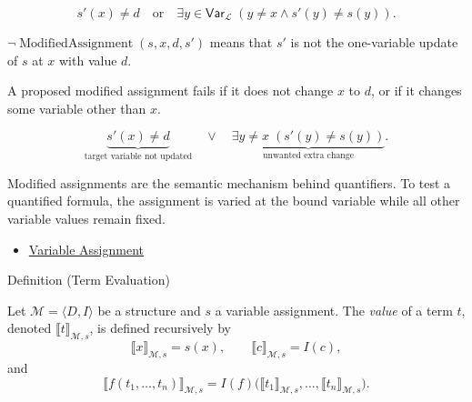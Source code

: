 \begin{remark*}
\[
s'(x)\neq d
\quad\text{or}\quad
\exists y\in\mathsf{Var}_{\mathcal L}\;(y\neq x\land s'(y)\neq s(y)).
\]
\end{remark*}

\begin{remark*}
\(\neg\operatorname{ModifiedAssignment}(s,x,d,s')\) means that \(s'\) is not the
one-variable update of \(s\) at \(x\) with value \(d\).
\end{remark*}

\begin{remark*}
A proposed modified assignment fails if it does not change \(x\) to \(d\), or
if it changes some variable other than \(x\).
\end{remark*}

\begin{remark*}
\[
\underbrace{s'(x)\neq d}_{\text{target variable not updated}}
\quad\lor\quad
\underbrace{\exists y\neq x\;(s'(y)\neq s(y))}_{\text{unwanted extra change}}.
\]
\end{remark*}

\begin{remark*}[Interpretation]
Modified assignments are the semantic mechanism behind quantifiers. To test a
quantified formula, the assignment is varied at the bound variable while all
other variable values remain fixed.
\end{remark*}

\begin{dependencies}
\begin{itemize}
  \item \hyperref[def:var-assign]{Variable Assignment}
\end{itemize}
\end{dependencies}

\begin{definitionbox}{Definition (Term Evaluation)}
\begin{definition}
\label{def:term-interp}
Let \(\mathcal M=\langle D,I\rangle\) be a structure and \(s\) a variable
assignment. The \emph{value} of a term \(t\), denoted
\(\llbracket t\rrbracket_{\mathcal M,s}\), is defined recursively by
\[
\llbracket x\rrbracket_{\mathcal M,s}=s(x),\qquad
\llbracket c\rrbracket_{\mathcal M,s}=I(c),
\]
and
\[
\llbracket f(t_1,\ldots,t_n)\rrbracket_{\mathcal M,s}
=
I(f)\bigl(\llbracket t_1\rrbracket_{\mathcal M,s},\ldots,
\llbracket t_n\rrbracket_{\mathcal M,s}\bigr).
\]
\end{definition}
\end{definitionbox}

